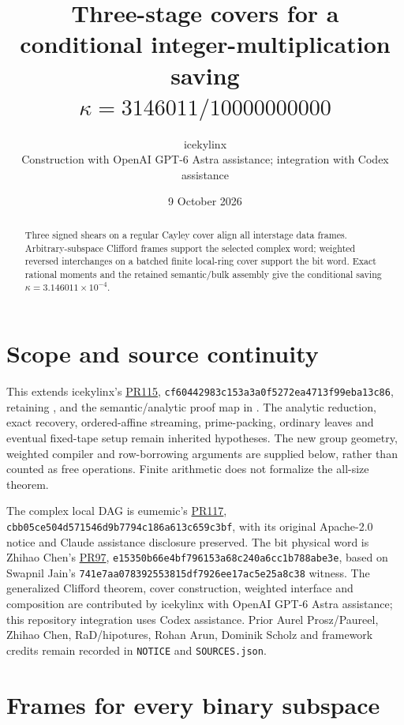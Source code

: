 \documentclass[11pt]{article}
\title{Three-stage covers for a conditional integer-multiplication saving\\
\large $\kappa=3146011/10000000000$}
\author{icekylinx\\\small Construction with OpenAI GPT-6 Astra assistance;
integration with Codex assistance}
\date{9 October 2026}
\begin{document}
\maketitle
\begin{abstract}
Three signed shears on a regular Cayley cover align all interstage data
frames. Arbitrary-subspace Clifford frames support the selected complex
word; weighted reversed interchanges on a batched finite local-ring cover
support the bit word. Exact rational moments and the retained semantic/bulk
assembly give the conditional saving $\kappa=3.146011\times10^{-4}$.
\end{abstract}

\section{Scope and source continuity}
This extends icekylinx's
\href{https://github.com/CrocSwap/integer-mult-bounds/pull/115}{PR115},
\texttt{cf60442983c153a3a0f5272ea4713f99eba13c86}, retaining
, 
and the semantic/analytic proof map in
.
The analytic reduction, exact recovery, ordered-affine streaming,
prime-packing, ordinary leaves and eventual fixed-tape setup remain
inherited hypotheses. The new group geometry, weighted compiler and
row-borrowing arguments are supplied below, rather than counted as free
operations. Finite arithmetic does not formalize the all-size theorem.

The complex local DAG is eumemic's
\href{https://github.com/CrocSwap/integer-mult-bounds/pull/117}{PR117},
\texttt{cbb05ce504d571546d9b7794c186a613c659c3bf}, with its original
Apache-2.0 notice and Claude assistance disclosure preserved.
The bit physical word is Zhihao Chen's
\href{https://github.com/CrocSwap/integer-mult-bounds/pull/97}{PR97},
\texttt{e15350b66e4bf796153a68c240a6cc1b788abe3e}, based on Swapnil Jain's
\texttt{741e7aa078392553815df7926ee17ac5e25a8c38} witness.
The generalized Clifford theorem, cover construction, weighted interface
and composition are contributed by icekylinx with OpenAI GPT-6 Astra assistance;
this repository integration uses Codex assistance.
Prior Aurel Prosz/Paureel, Zhihao Chen, RaD/hipotures, Rohan Arun,
Dominik Scholz and framework credits remain recorded in
\texttt{NOTICE} and \texttt{SOURCES.json}.

\section{Frames for every binary subspace}

\end{document}
